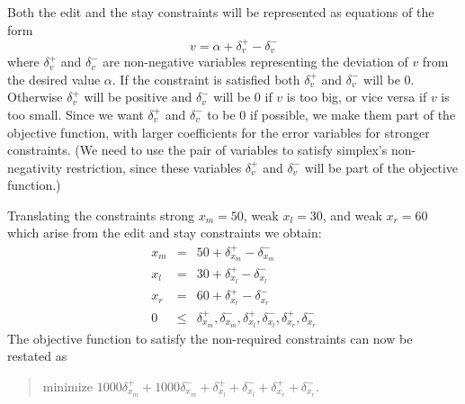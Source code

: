 \documentclass{article}
\newcommand{\strength}{\sf}
\begin{document}
Both the edit and the stay constraints will be represented as equations of
the form  
$$v = \alpha + \delta_v^{+} - \delta_v^{-}$$
where $\delta_v^{+}$ and $\delta_v^{-}$ are non-negative variables
representing the
deviation of $v$ from the desired value $\alpha$.  If the constraint is
satisfied both $\delta_v^{+}$ and $\delta_v^{-}$ will be 0.  
Otherwise $\delta_v^{+}$ will be
positive and $\delta_v^{-}$ will be 0 if $v$ is too big, 
or vice versa if $v$ is
too small.  
Since we want $\delta_v^{+}$ and $\delta_v^{-}$ to be 0 if
possible, we make them part of the objective function, with larger
coefficients for the error variables for stronger constraints.
(We need to use the pair of variables to satisfy simplex's
non-negativity restriction, since these variables  $\delta_v^{+}$ and
$\delta_v^{-}$ will be part of the objective function.)  

Translating the constraints
{\strength strong} $x_m = 50$, 
{\strength weak} $x_l = 30$,
and {\strength weak} $x_r = 60$
which arise from the 
edit and stay constraints we obtain:
$$\begin{array}{rcl}
x_m & = &50 + \delta_{x_m}^+ -  \delta_{x_m}^- \\
x_l & = &30 + \delta_{x_l}^+ -  \delta_{x_l}^- \\
x_r &= &60 + \delta_{x_r}^+ -  \delta_{x_r}^- \\
0 &\leq& \delta_{x_m}^+, \delta_{x_m}^-, \delta_{x_l}^+, \delta_{x_l}^-, 
        \delta_{x_r}^+, \delta_{x_r}^-
\end{array}$$
The objective function to satisfy the
non-required constraints 
can now be restated as

\begin{quote}\vspace*{-1ex}
minimize $1000 \delta_{x_m}^+ + 1000  \delta_{x_m}^- + \delta_{x_l}^+ +  
        \delta_{x_l}^- + \delta_{x_r}^+ +  \delta_{x_r}^-$.
\end{quote}\vspace{-0.9ex}
\end{document}
